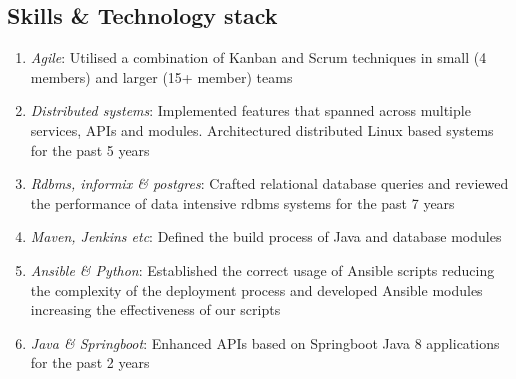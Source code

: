 \documentclass{CVSoftwareEngineer}
\begin{document}
\begin{paracol}{2}
		\section{Skills \& Technology stack}
		\begin{enumerate}[leftmargin=*, rightmargin=10pt]
			\item[\textasteriskcentered] \textit{Agile}: Utilised a combination of Kanban and Scrum techniques in small (4 members)
				and larger (15+ member) teams
			\item[\textasteriskcentered] \textit{Distributed systems}: Implemented features that spanned across multiple services,
				APIs and modules. Architectured distributed Linux based systems for the past 5 years
			\item[\textasteriskcentered] \textit{Rdbms, informix \& postgres}: Crafted relational database queries and reviewed
				the performance of data intensive rdbms systems for the past 7 years
			\item[\textasteriskcentered] \textit{Maven, Jenkins etc}: Defined the build process of Java and database modules
			\item[\textasteriskcentered] \textit{Ansible \& Python}: Established the correct usage of Ansible scripts reducing the complexity
				of the deployment process and developed Ansible modules increasing the effectiveness of our scripts
			\item[\textasteriskcentered] \textit{Java \& Springboot}: Enhanced APIs based on Springboot Java 8
				applications for the past 2 years
		\end{enumerate}

	\end{paracol}
\end{document}
